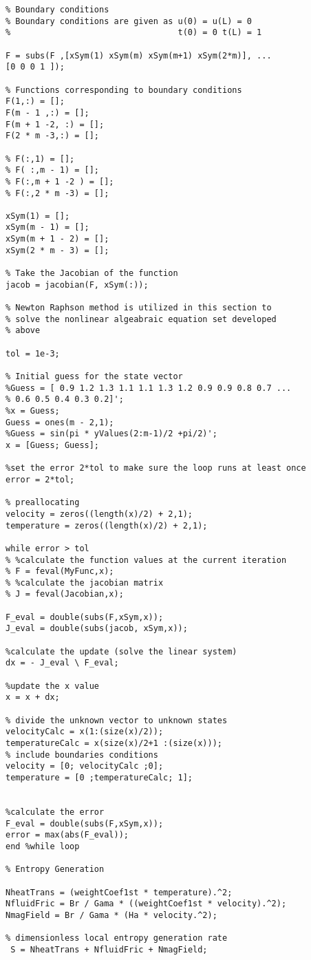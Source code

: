 \begin{lstlisting}
% Boundary conditions
% Boundary conditions are given as u(0) = u(L) = 0
%                                  t(0) = 0 t(L) = 1

F = subs(F ,[xSym(1) xSym(m) xSym(m+1) xSym(2*m)], ...
[0 0 0 1 ]);

% Functions corresponding to boundary conditions
F(1,:) = [];
F(m - 1 ,:) = [];
F(m + 1 -2, :) = [];
F(2 * m -3,:) = [];

% F(:,1) = [];
% F( :,m - 1) = [];
% F(:,m + 1 -2 ) = [];
% F(:,2 * m -3) = [];

xSym(1) = [];
xSym(m - 1) = [];
xSym(m + 1 - 2) = [];
xSym(2 * m - 3) = [];

% Take the Jacobian of the function
jacob = jacobian(F, xSym(:));

% Newton Raphson method is utilized in this section to 
% solve the nonlinear algeabraic equation set developed 
% above

tol = 1e-3;

% Initial guess for the state vector
%Guess = [ 0.9 1.2 1.3 1.1 1.1 1.3 1.2 0.9 0.9 0.8 0.7 ...
% 0.6 0.5 0.4 0.3 0.2]';
%x = Guess;
Guess = ones(m - 2,1);
%Guess = sin(pi * yValues(2:m-1)/2 +pi/2)';
x = [Guess; Guess];

%set the error 2*tol to make sure the loop runs at least once 
error = 2*tol;

% preallocating
velocity = zeros((length(x)/2) + 2,1);
temperature = zeros((length(x)/2) + 2,1);

while error > tol
% %calculate the function values at the current iteration
% F = feval(MyFunc,x);
% %calculate the jacobian matrix
% J = feval(Jacobian,x);

F_eval = double(subs(F,xSym,x));
J_eval = double(subs(jacob, xSym,x));

%calculate the update (solve the linear system)
dx = - J_eval \ F_eval;

%update the x value
x = x + dx;

% divide the unknown vector to unknown states
velocityCalc = x(1:(size(x)/2));
temperatureCalc = x(size(x)/2+1 :(size(x)));
% include boundaries conditions
velocity = [0; velocityCalc ;0];
temperature = [0 ;temperatureCalc; 1];


%calculate the error
F_eval = double(subs(F,xSym,x));
error = max(abs(F_eval));
end %while loop 

% Entropy Generation

NheatTrans = (weightCoef1st * temperature).^2;
NfluidFric = Br / Gama * ((weightCoef1st * velocity).^2);
NmagField = Br / Gama * (Ha * velocity.^2);

% dimensionless local entropy generation rate
 S = NheatTrans + NfluidFric + NmagField;
 
 \end{lstlisting}


